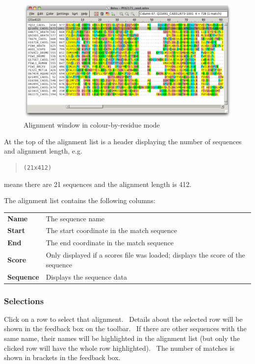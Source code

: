 \documentclass[letterpaper]{article}
\begin{document}
\begin{figure}[htb]
\centering
\color{lightblue}
\includegraphics[width=\textwidth]{img_window_alignment_by_residue.png}
\caption{Alignment window in colour-by-residue mode}
\label{fig:belvu_residue}
\end{figure}

At the top of the alignment list is a header displaying the number of sequences and alignment length, e.g.
\begin{quote}
\begin{verbatim}
(21x412)
\end{verbatim}
\end{quote}
means there are 21 sequences and the alignment length is 412.

\bigskip

The alignment list contains the following columns:

\begin{supertabular}{>{\bfseries}l l}
Name &
The sequence name\\
Start &
The start coordinate in the match sequence\\
End &
The end coordinate in the match sequence\\
Score &
Only displayed if a scores file was loaded; displays the score of the sequence\\
Sequence &
Displays the sequence data\\
\end{supertabular}

\subsubsection[Selections]{Selections}
Click on a row to select that alignment. \ Details about the selected row will be shown in the feedback box on the toolbar. \ If there are other sequences with the same name, their names will be highlighted in the alignment list (but only the clicked row will have the whole row highlighted). \ The number of matches is shown in brackets in the feedback box.
\end{document}
